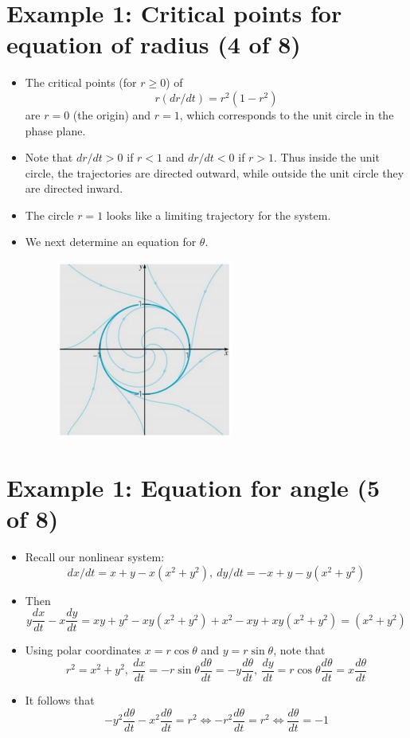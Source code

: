 \documentclass[11pt,a4paper]{article}
\begin{document}
	\section*{Example 1: Critical points for equation of radius (4 of 8)}
	\begin{itemize}
		\item The critical points (for $r \geq 0$) of
		$$
		r(dr/dt) = r^2(1-r^2)
		$$
		are $r = 0$ (the origin) and $r = 1$, which corresponds to the unit circle in the phase plane.
		\item Note that $dr/dt > 0$ if $r < 1$ and $dr/dt < 0$ if $r > 1$. Thus inside the unit circle, the trajectories are directed outward, while outside the unit circle they are directed inward.
		\item The circle $r = 1$ looks like a limiting trajectory for the system.
		\item We next determine an equation for $\theta$.
		\begin{figure}[H]
			\centering
			\includegraphics[width=0.55\textwidth]{figure/Lec19f4.PNG}
		\end{figure}
	\end{itemize}
	\section*{Example 1: Equation for angle (5 of 8)}
	\begin{itemize}
		\item Recall our nonlinear system:
		$$
		dx/dt = x+y-x(x^2+y^2),\ dy/dt = -x+y-y(x^2+y^2)
		$$
		\item Then
		$$
		y\frac{dx}{dt} - x\frac{dy}{dt} = xy + y^2 - xy(x^2+y^2) + x^2 - xy + xy(x^2+y^2) = (x^2+y^2)
		$$
		\item Using polar coordinates $x = r\cos\theta $ and $y = r\sin\theta$, note that
		$$
		r^2 = x^2+y^2,\ \frac{dx}{dt} = -r\sin\theta \frac{d\theta}{dt} = -y\frac{d\theta}{dt},\ \frac{dy}{dt} = r\cos \theta\frac{d\theta}{dt} = x\frac{d\theta}{dt}
		$$
		\item It follows that
		$$
		-y^2\frac{d\theta}{dt}-x^2\frac{d\theta}{dt} = r^2 \Leftrightarrow -r^2\frac{d\theta}{dt} = r^2 \Leftrightarrow \frac{d\theta}{dt} = -1
		$$
	\end{itemize}
\end{document}
